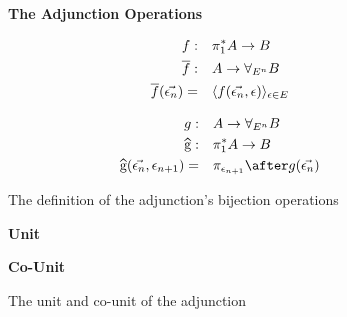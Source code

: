 \documentclass{Report}
\begin{document}
\begin{figure}
    \begin{framed}
        


        \centering
        \textbf{The Adjunction Operations}
        

        \begin{align*}
            f:&\quad \pi_1^* A \rightarrow B\\
            \overline{f}:&\quad A\rightarrow \forall_{E^n} B\\
            \overline{f}(\vec{\epsilon_n}) =&\quad \langle f(\vec{\epsilon_n}, \epsilon)\rangle_{\epsilon\in E}
        \end{align*}
        

        \begin{align*}
            g:&\quad A \rightarrow \allEn B\\
            \widehat{g}:&\quad \pstar A\rightarrow B\\
            \widehat{g}(\env, \e_{n+1}) =&\quad\pi_{\e_{n+1}}\after g(\env)
        \end{align*}
    \end{framed}

    \caption{The definition of the adjunction's bijection operations}
    \label{AdjunctionDefinition}
\end{figure}



\begin{figure}
    \centering
    \begin{minipage}{0.47\textwidth}
      \begin{framed}
        \centering
        \textbf{Unit}
  
      \end{framed}
    \end{minipage}
    \quad
    \begin{minipage}{0.47\textwidth}
      \begin{framed}
        \centering
        \textbf{Co-Unit}
  
      \end{framed}
    \end{minipage}

\caption{The unit and co-unit of the adjunction}
    \label{UnitCoUnitDefinition}
\end{figure}
\end{document}
